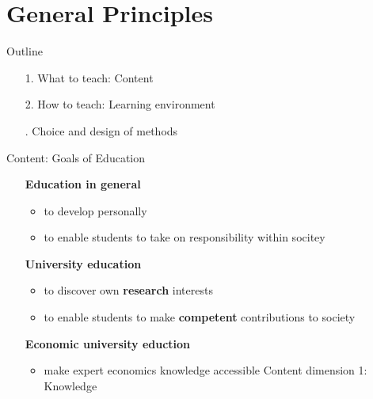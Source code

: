 \section*{General Principles}

\begin{frame}{Outline}
	\begin{itemize}[<+->]
		\item[1.] What to teach: Content 
		\item[2.] How to teach: Learning environment
		\item[\ar 3.] Choice and design of methods
	\end{itemize}
\end{frame}
\begin{frame}{Content: Goals of Education}
	\pause
	\centering
	\vspace{-4mm}
	\begin{itemize}[<+->]
		\item[] \hspace{-10mm} \centering \textbf{Education in general}
		\begin{itemize}
			\item  to develop personally 
			\item to enable students to take on responsibility within socitey %
		\end{itemize}
		\vspace{2mm}
		\item[] \hspace{-9.4mm} \centering \textbf{University education}
		\begin{itemize}
			\item to discover own \textbf{research} interests 
			\item to enable students to make \textbf{competent} contributions to society
		\end{itemize}
		\vspace{2mm}
		\item[] \hspace{-10mm} \centering \textbf{Economic university eduction}
		\begin{itemize}
			\item make expert economics knowledge accessible \ar \alert{Content dimension 1: Knowledge}\\

\end{itemize}
\end{itemize}
\end{frame}
